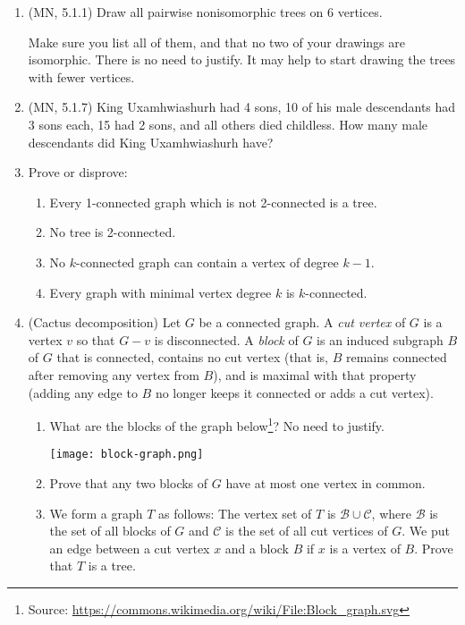 \documentclass{amsart}
\theoremstyle{definition}
\begin{document}
\begin{enumerate}
\item (MN, 5.1.1) Draw all pairwise nonisomorphic trees on 6 vertices.

  Make sure you list all of them, and that no two of your drawings are isomorphic. There is no need to justify. It may help to start drawing the trees with fewer vertices.
\item (MN, 5.1.7) King Uxamhwiashurh had 4 sons, 10 of his male descendants had 3 sons each, 15 had 2 sons, and all others died childless. How many male descendants did King Uxamhwiashurh have?  
\item Prove or disprove:
  \begin{enumerate}
  \item Every 1-connected graph which is not 2-connected is a tree.
  \item No tree is 2-connected.
  \item No $k$-connected graph can contain a vertex of degree $k - 1$.
  \item Every graph with minimal vertex degree $k$ is $k$-connected.
  \end{enumerate}
  \item (Cactus decomposition)
    Let $G$ be a connected graph. A \emph{cut vertex} of $G$ is a vertex $v$ so that $G - v$ is disconnected. A \emph{block} of $G$ is an induced subgraph $B$ of $G$ that is connected, contains no cut vertex (that is, $B$ remains connected after removing any vertex from $B$), and is maximal with that property (adding any edge to $B$ no longer keeps it connected or adds a cut vertex). 

    \begin{enumerate}
    \item What are the blocks of the graph below\footnote{Source: \url{https://commons.wikimedia.org/wiki/File:Block_graph.svg}}? No need to justify.

      \texttt{[image: block-graph.png]}
      
    \item Prove that any two blocks of $G$ have at most one vertex in common.
    \item We form a graph $T$ as follows: The vertex set of $T$ is $\mathcal{B} \cup \mathcal{C}$, where $\mathcal{B}$ is the set of all blocks of $G$ and $\mathcal{C}$ is the set of all cut vertices of $G$. We put an edge between a cut vertex $x$ and a block $B$ if $x$ is a vertex of $B$. Prove that $T$ is a tree.
    \end{enumerate}



\end{enumerate}
\end{document}
